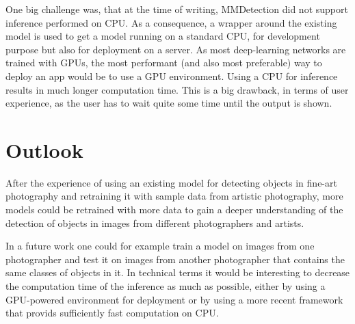 \documentclass[a4paper,10pt,hidelinks]{scrartcl}
\begin{document}
One big challenge was, that at the time of writing, MMDetection did not support inference performed on CPU. As a consequence, a wrapper around the existing model is used to get a model running on a standard CPU, for development purpose but also for deployment on a server. As most deep-learning networks are trained with GPUs, the most performant (and also most preferable) way to deploy an app would be to use a GPU environment. Using a CPU for inference results in much longer computation time. This is a big drawback, in terms of user experience, as the user has to wait quite some time until the output is shown.

\section{\fontsize{14}{16}\selectfont Outlook}

After the experience of using an existing model for detecting objects in fine-art photography and retraining it with sample data from artistic photography, more models could be retrained with more data to gain a deeper understanding of the detection of objects in images from different photographers and artists.

In a future work one could for example train a model on images from one photographer and test it on images from another photographer that contains the same classes of objects in it. In technical terms it would be interesting to decrease the computation time of the inference as much as possible, either by using a GPU-powered environment for deployment or by using a more recent framework that provids sufficiently fast computation on CPU.
\end{document}
